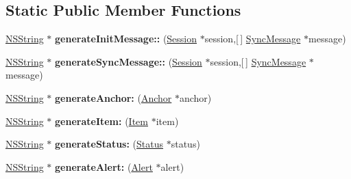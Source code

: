 \subsection*{\-Static \-Public \-Member \-Functions}
\begin{DoxyCompactItemize}
\item 
\hypertarget{interface_sync_x_m_l_generator_a9abe02b42fa8da34aa276c3e6a5e804f}{
\hyperlink{class_n_s_string}{\-N\-S\-String} $\ast$ {\bfseries generate\-Init\-Message\-::} (\hyperlink{interface_session}{\-Session} $\ast$session,\mbox{[}$\,$\mbox{]} \hyperlink{interface_sync_message}{\-Sync\-Message} $\ast$message)}
\label{interface_sync_x_m_l_generator_a9abe02b42fa8da34aa276c3e6a5e804f}

\item 
\hypertarget{interface_sync_x_m_l_generator_a70325198a6721de22822f04cb9843237}{
\hyperlink{class_n_s_string}{\-N\-S\-String} $\ast$ {\bfseries generate\-Sync\-Message\-::} (\hyperlink{interface_session}{\-Session} $\ast$session,\mbox{[}$\,$\mbox{]} \hyperlink{interface_sync_message}{\-Sync\-Message} $\ast$message)}
\label{interface_sync_x_m_l_generator_a70325198a6721de22822f04cb9843237}

\item 
\hypertarget{interface_sync_x_m_l_generator_a20f39de42042abc02ec0aac0796abcfc}{
\hyperlink{class_n_s_string}{\-N\-S\-String} $\ast$ {\bfseries generate\-Anchor\-:} (\hyperlink{interface_anchor}{\-Anchor} $\ast$anchor)}
\label{interface_sync_x_m_l_generator_a20f39de42042abc02ec0aac0796abcfc}

\item 
\hypertarget{interface_sync_x_m_l_generator_a6b53613fa727aad841421f7448c742b7}{
\hyperlink{class_n_s_string}{\-N\-S\-String} $\ast$ {\bfseries generate\-Item\-:} (\hyperlink{interface_item}{\-Item} $\ast$item)}
\label{interface_sync_x_m_l_generator_a6b53613fa727aad841421f7448c742b7}

\item 
\hypertarget{interface_sync_x_m_l_generator_aeb9e74a9dd7a71e07184c4ffcf9dfb12}{
\hyperlink{class_n_s_string}{\-N\-S\-String} $\ast$ {\bfseries generate\-Status\-:} (\hyperlink{interface_status}{\-Status} $\ast$status)}
\label{interface_sync_x_m_l_generator_aeb9e74a9dd7a71e07184c4ffcf9dfb12}

\item 
\hypertarget{interface_sync_x_m_l_generator_a857ac7e2b3dc878a4cf3a9b475d2fe44}{
\hyperlink{class_n_s_string}{\-N\-S\-String} $\ast$ {\bfseries generate\-Alert\-:} (\hyperlink{interface_alert}{\-Alert} $\ast$alert)}
\label{interface_sync_x_m_l_generator_a857ac7e2b3dc878a4cf3a9b475d2fe44}


\end{DoxyCompactItemize}
